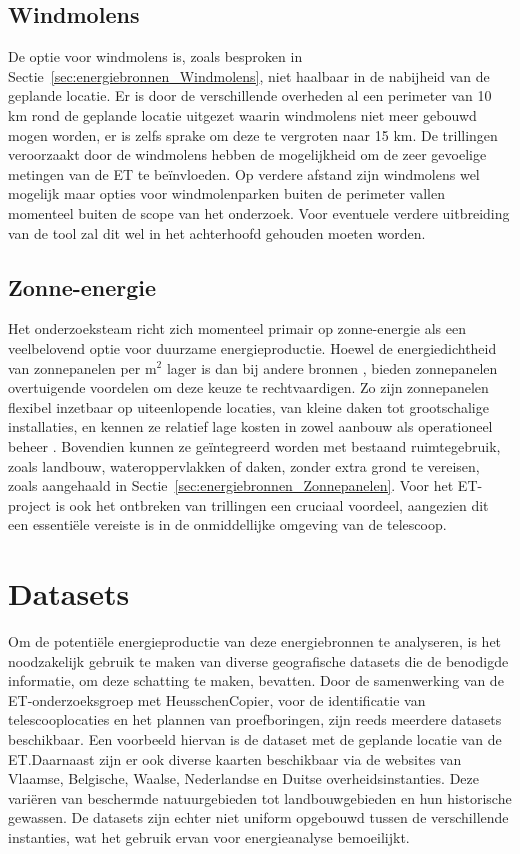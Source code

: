 \subsection{Windmolens}
De optie voor windmolens is, zoals besproken in Sectie~\ref{sec:energiebronnen_Windmolens}, niet haalbaar in de nabijheid van de geplande locatie. Er is door de verschillende overheden al een perimeter van 10 km rond de geplande locatie uitgezet waarin windmolens niet meer gebouwd mogen worden, er is zelfs sprake om deze te vergroten naar 15 km. De trillingen veroorzaakt door de windmolens hebben de mogelijkheid om de zeer gevoelige metingen van de ET te beïnvloeden. Op verdere afstand zijn windmolens wel mogelijk maar opties voor windmolenparken buiten de perimeter vallen momenteel buiten de scope van het onderzoek. Voor eventuele verdere uitbreiding van de tool zal dit wel in het achterhoofd gehouden moeten worden.

\subsection{Zonne-energie}
Het onderzoeksteam richt zich momenteel primair op zonne-energie als een veelbelovend optie voor duurzame energieproductie. Hoewel de energiedichtheid van zonnepanelen per $\mathrm{m}^2$ lager is dan bij andere bronnen \autocite{fritsche2017energy}, bieden zonnepanelen overtuigende voordelen om deze keuze te rechtvaardigen. Zo zijn zonnepanelen flexibel inzetbaar op uiteenlopende locaties, van kleine daken tot grootschalige installaties, en kennen ze relatief lage kosten in zowel aanbouw als operationeel beheer \parencite{IREA2025}. Bovendien kunnen ze geïntegreerd worden met bestaand ruimtegebruik, zoals landbouw, wateroppervlakken of daken, zonder extra grond te vereisen, zoals aangehaald in Sectie~\ref{sec:energiebronnen_Zonnepanelen}. Voor het ET-project is ook het ontbreken van trillingen een cruciaal voordeel, aangezien dit een essentiële vereiste is in de onmiddellijke omgeving van de telescoop.

\section{Datasets}
Om de potentiële energieproductie van deze energiebronnen te analyseren, is het noodzakelijk gebruik te maken van diverse geografische datasets die de benodigde informatie, om deze schatting te maken, bevatten. Door de samenwerking van de ET-onderzoeksgroep met HeusschenCopier, voor de identificatie van telescooplocaties en het plannen van proefboringen, zijn reeds meerdere datasets beschikbaar. Een voorbeeld hiervan is de dataset met de geplande locatie van de ET.\@ Daarnaast zijn er ook diverse kaarten beschikbaar via de websites van Vlaamse, Belgische, Waalse, Nederlandse en Duitse overheidsinstanties. Deze variëren van beschermde natuurgebieden tot landbouwgebieden en hun historische gewassen. De datasets zijn echter niet uniform opgebouwd tussen de verschillende instanties, wat het gebruik ervan voor energieanalyse bemoeilijkt.\medskip

